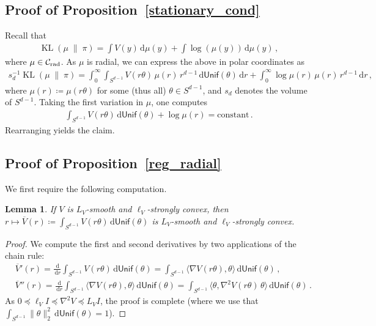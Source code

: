 \documentclass[twoside]{article}
\newcommand{\cC}{\mathcal{C}}
\newcommand{\1}{\mathds{1}}
\newcommand{\kl}[2]{\KL(#1 \!\;\|\; \!#2)}
\newcommand*{\defeq}{\coloneqq}
\newcommand*{\rd}{\mathrm{d}}
\newcommand*{\dd}{\, \rd}
\DeclareMathOperator*{\KL}{KL}
\newcommand{\Crad}{\cC_{\rm rad}}
\theoremstyle{plain}
\newtheorem{lemma}[theorem]{Lemma}
\theoremstyle{definition}
\theoremstyle{remark}
\begin{document}
\subsection{Proof of Proposition~\ref{stationary_cond}}
Recall that
\begin{align*}
    \kl{\mu}{\pi} = \int V(y)\dd\mu(y) + \int \log(\mu(y))\dd\mu(y)\,,
\end{align*}
where $\mu \in \Crad$. As $\mu$ is radial, we can express the above in polar coordinates as
\begin{align*}
    {s_d^{-1}}\kl{\mu}{\pi} = \int_0^\infty \int_{S^{d-1}} V(r\theta) \,\mu(r)\, r^{d-1}\dd{\mathsf{Unif}}(\theta) \dd r + \int_0^\infty \log \mu(r)\, \mu(r)\, r^{d-1}\dd r\,,
\end{align*}
{where $\mu(r) \defeq \mu(r\theta)$ for some (thus all) $\theta \in S^{d-1}$, and $s_d$ denotes the volume of $S^{d-1}$.}
Taking the first variation in $\mu$, one computes
\begin{align*}
    \int_{S^{d-1}}V(r\theta) \dd {\mathsf{Unif}}(\theta) + \log \mu(r) = {\text{constant}}\,.
\end{align*}
Rearranging yields the claim.


\subsection{Proof of Proposition~\ref{reg_radial}}

We first require the following computation.
\begin{lemma}
If $V$ is $L_V$-smooth and $\ell_V$-strongly convex, then $r\mapsto \overline{V}(r) \defeq \int_{S^{d-1}} V(r\theta)\dd{\mathsf{Unif}}(\theta)$ is $L_V$-smooth and $\ell_V$-strongly convex.
\end{lemma}
\begin{proof}
    We compute the first and second derivatives by two applications of the chain rule:
    \begin{align*}
        &\overline{V}'(r) = \frac{\dd}{\dd r} \int_{S^{d-1}} V(r\theta)\dd{\mathsf{Unif}}(\theta) =   \int_{S^{d-1}} \langle \nabla V(r\theta), \theta \rangle \dd {\mathsf{Unif}}(\theta)\,, \\
        &\overline{V}''(r) = \frac{\dd}{\dd r}\int_{S^{d-1}} \langle \nabla V(r\theta), \theta \rangle \dd {\mathsf{Unif}}(\theta) = \int_{S^{d-1}} \langle \theta, \nabla^2 V(r\theta)\, \theta \rangle \dd {\mathsf{Unif}}(\theta)\,.
    \end{align*}
As $0\preceq \ell_V I \preceq \nabla^2 V \preceq L_V I$, the proof is complete (where we use that $\int_{S^{d-1}} \|\theta\|^2_2 \dd {\mathsf{Unif}}(\theta) = 1$).
\end{proof}
\end{document}

